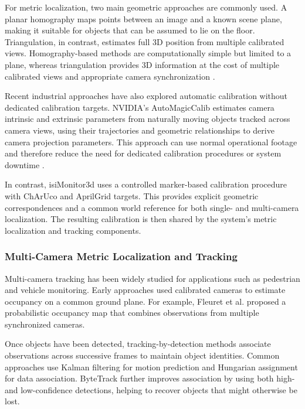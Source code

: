 \documentclass[9pt,a4paper,twocolumn]{rho-class/rho}
\begin{document}
For metric localization, two main geometric approaches are commonly used. A planar homography maps points between an image and a known scene plane, making it suitable for objects that can be assumed to lie on the floor. Triangulation, in contrast, estimates full 3D position from multiple calibrated views. Homography-based methods are computationally simple but limited to a plane, whereas triangulation provides 3D information at the cost of multiple calibrated views and appropriate camera synchronization \cite{hartley2004multiple}.

Recent industrial approaches have also explored automatic calibration without dedicated calibration targets. NVIDIA's AutoMagicCalib estimates camera intrinsic and extrinsic parameters from naturally moving objects tracked across camera views, using their trajectories and geometric relationships to derive camera projection parameters. This approach can use normal operational footage and therefore reduce the need for dedicated calibration procedures or system downtime \cite{nvidia2026automagiccalib}.

In contrast, isiMonitor3d uses a controlled marker-based calibration procedure with ChArUco and AprilGrid targets. This provides explicit geometric correspondences and a common world reference for both single- and multi-camera localization. The resulting calibration is then shared by the system's metric localization and tracking components.

\subsubsection{Multi-Camera Metric Localization and Tracking}

Multi-camera tracking has been widely studied for applications such as pedestrian and vehicle monitoring. Early approaches used calibrated cameras to estimate occupancy on a common ground plane. For example, Fleuret et al. \cite{fleuret2008multicamera} proposed a probabilistic occupancy map that combines observations from multiple synchronized cameras.

Once objects have been detected, tracking-by-detection methods associate observations across successive frames to maintain object identities. Common approaches use Kalman filtering for motion prediction and Hungarian assignment for data association. ByteTrack \cite{zhang2022bytetrack} further improves association by using both high- and low-confidence detections, helping to recover objects that might otherwise be lost.
\end{document}

